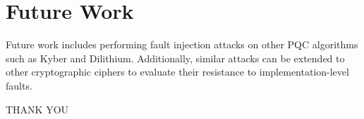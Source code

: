 \documentclass{beamer}
\newenvironment{tres important}[2][]{
	\setkeys{EmphEqEnv}{#2}
	\setkeys{EmphEqOpt}{box={\setlength{\fboxsep}{10pt}\fcolorbox{myNewColorA}{white}},#1}
	\EmphEqMainEnv}
{\endEmphEqMainEnv}
\begin{document}
\section{Future Work}
\begin{frame}
  Future work includes performing fault injection attacks on other PQC algorithms such as Kyber and Dilithium. Additionally, similar attacks can be extended to other cryptographic ciphers to evaluate their resistance to implementation-level faults.
\end{frame}
\begin{frame}
  \LARGE
  \centering
  THANK YOU
\end{frame}
\end{document}

